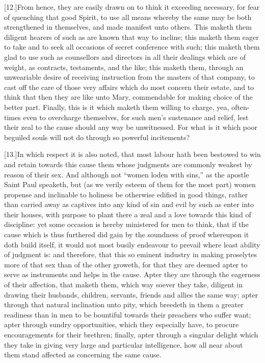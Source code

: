 [12.]From hence, they are easily drawn on to think it exceeding necessary, for fear of quenching that good Spirit, to use all means whereby the same may be both strengthened in themselves, and made manifest unto others. This maketh them diligent hearers of such as are known that way to incline; this maketh them eager to take and to seek all occasions of secret conference with such; this maketh them glad to use such as counsellors and directors in all their dealings which are of weight, as contracts, testaments, and the like; this maketh them, through an unweariable desire of receiving instruction from the masters of that company, to cast off the care of those very affairs which do most concern their estate, and to think that then they are like unto Mary, commendable for making choice of the better part. Finally, this is it which maketh them willing to charge, yea, often-times even to overcharge themselves, for such men’s sustenance and relief, lest their zeal to the cause should any way be unwitnessed. For what is it which poor beguiled souls will not do through so powerful incitements?

[13.]In which respect it is also noted, that most labour hath been bestowed to win and retain towards this cause them whose judgments are commonly weakest by reason of their sex. And although not “women loden with sins,” as the apostle Saint Paul speaketh, but (as we verily esteem of them for the most part) women propense and inclinable to holiness be otherwise edified in good things, rather than carried away as captives into any kind of sin and evil by such as enter into their houses, with purpose to plant there a zeal and a love towards this kind of discipline: yet some occasion is hereby ministered for men to think, that if the cause which is thus furthered did gain by the soundness of proof whereupon it doth build itself, it would not most busily endeavour to prevail where least ability of judgment is: and therefore, that this so eminent industry in making proselytes more of that sex than of the other groweth, for that they are deemed apter to serve as instruments and helps in the cause. Apter they are through the eagerness of their affection, that maketh them, which way soever they take, diligent in drawing their husbands, children, servants, friends and allies the same way; apter through that natural inclination unto pity, which breedeth in them a greater readiness than in men to be bountiful towards their preachers who suffer want; apter through sundry opportunities, which they especially have, to procure encouragements for their brethren; finally, apter through a singular delight which they take in giving very large and particular intelligence, how all near about them stand affected as concerning the same cause.

